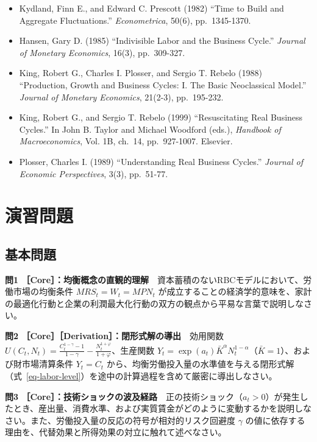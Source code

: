 \documentclass[
  japanese,
  lualatex,
  ja=standard,
  12pt,
  a4paper]{ltjsarticle}
\providecommand{\tightlist}{%
  \setlength{\itemsep}{0pt}\setlength{\parskip}{0pt}}
\begin{document}
\begin{itemize}
\tightlist
\item
  Kydland, Finn E., and Edward C. Prescott (1982) ``Time to Build and
  Aggregate Fluctuations.'' \emph{Econometrica}, 50(6), pp.~1345-1370.
\item
  Hansen, Gary D. (1985) ``Indivisible Labor and the Business Cycle.''
  \emph{Journal of Monetary Economics}, 16(3), pp.~309-327.
\item
  King, Robert G., Charles I. Plosser, and Sergio T. Rebelo (1988)
  ``Production, Growth and Business Cycles: I. The Basic Neoclassical
  Model.'' \emph{Journal of Monetary Economics}, 21(2-3), pp.~195-232.
\item
  King, Robert G., and Sergio T. Rebelo (1999) ``Resuscitating Real
  Business Cycles.'' In John B. Taylor and Michael Woodford (eds.),
  \emph{Handbook of Macroeconomics}, Vol. 1B, ch.~14, pp.~927-1007.
  Elsevier.
\item
  Plosser, Charles I. (1989) ``Understanding Real Business Cycles.''
  \emph{Journal of Economic Perspectives}, 3(3), pp.~51-77.
\end{itemize}

\section{演習問題}\label{ux6f14ux7fd2ux554fux984c}

\subsection{基本問題}\label{ux57faux672cux554fux984c}

\textbf{問1
［Core］：均衡概念の直観的理解}　資本蓄積のないRBCモデルにおいて、労働市場の均衡条件
\(MRS_t = W_t = MPN_t\)
が成立することの経済学的意味を、家計の最適化行動と企業の利潤最大化行動の双方の観点から平易な言葉で説明しなさい。

\textbf{問2 ［Core］［Derivation］：閉形式解の導出}　効用関数
\(U(C_t, N_t) = \frac{C_t^{1-\gamma}-1}{1-\gamma} - \frac{N_t^{1+\varphi}}{1+\varphi}\)、生産関数
\(Y_t = \exp(a_t) \bar{K}^\alpha N_t^{1-\alpha}\)（\(\bar{K}=1\)）、および財市場清算条件
\(Y_t = C_t\)
から、均衡労働投入量の水準値を与える閉形式解（式~\ref{eq-labor-level}）を途中の計算過程を含めて厳密に導出しなさい。

\textbf{問3
［Core］：技術ショックの波及経路}　正の技術ショック（\(a_t > 0\)）が発生したとき、産出量、消費水準、および実質賃金がどのように変動するかを説明しなさい。また、労働投入量の反応の符号が相対的リスク回避度
\(\gamma\)
の値に依存する理由を、代替効果と所得効果の対立に触れて述べなさい。
\end{document}
